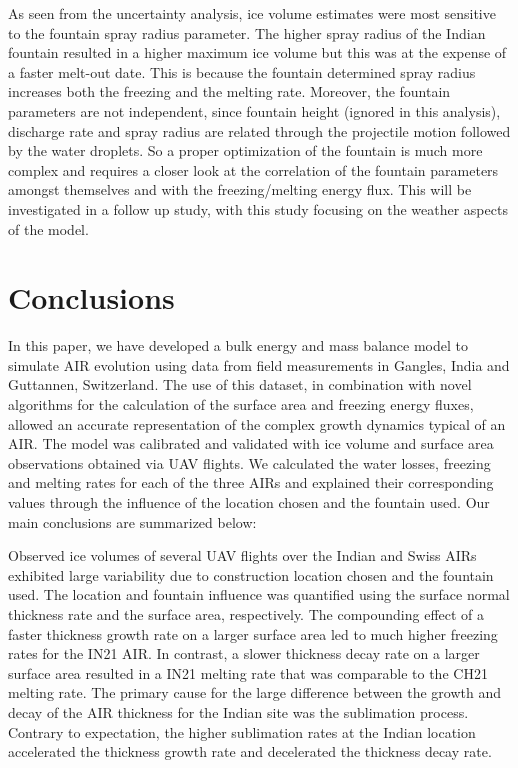\documentclass[utf8]{frontiersSCNS}
\begin{document}
As seen from the uncertainty analysis, ice volume estimates were most sensitive to the fountain spray radius
parameter. The higher spray radius of the Indian fountain resulted in a higher maximum ice volume but this was
at the expense of a faster melt-out date. This is because the fountain determined spray radius increases both
the freezing and the melting rate. Moreover, the fountain parameters are not independent, since fountain height
(ignored in this analysis), discharge rate and spray radius are related through the projectile motion followed
by the water droplets. So a proper optimization of the fountain is much more complex and requires a closer look
at the correlation of the fountain parameters amongst themselves and with the freezing/melting energy flux. This
will be investigated in a follow up study, with this study focusing on the weather aspects of the model.

\section{Conclusions}

In this paper, we have developed a bulk energy and mass balance model to simulate AIR evolution using data from
field measurements in Gangles, India and Guttannen, Switzerland. The use of this dataset, in combination with
novel algorithms for the calculation of the surface area and freezing energy fluxes, allowed an accurate
representation of the complex growth dynamics typical of an AIR. The model was calibrated and validated with ice
volume and surface area observations obtained via UAV flights. We calculated the water losses, freezing and
melting rates for each of the three AIRs and explained their corresponding values through the influence of the
location chosen and the fountain used. Our main conclusions are summarized below:

Observed ice volumes of several UAV flights over the Indian and Swiss AIRs exhibited large variability due to
construction location chosen and the fountain used. The location and fountain influence was quantified using the
surface normal thickness rate and the surface area, respectively. The compounding effect of a faster thickness
growth rate on a larger surface area led to much higher freezing rates for the IN21 AIR. In contrast, a slower
thickness decay rate on a larger surface area resulted in a IN21 melting rate that was comparable to the CH21 melting
rate. The primary cause for the large difference between the growth and decay of the AIR thickness for the
Indian site was the sublimation process.  Contrary to expectation, the higher sublimation rates at the Indian
location accelerated the thickness growth rate and decelerated the thickness decay rate.
\end{document}
